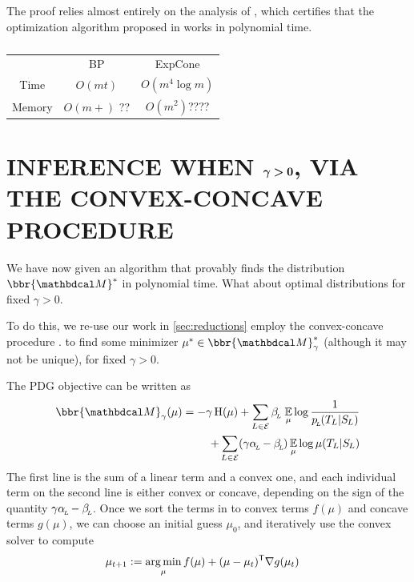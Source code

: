 \documentclass[twoside]{article}
\begin{document}
The proof relies almost entirely on the analysis of \textcite{badenbroek2021algorithm},
which certifies that the optimization algorithm 
proposed in \textcite{dahl2022primal} works in polynomial time. 

\begin{table}
    \centering
    \begin{tabular}{ccc}
        \toprule
        & BP &  ExpCone \\\cmidrule(lr){2-3}
        Time & $O(m t)$ & $O( m^4 \log m )$ \\
        Memory  & $O(m + )$ {\color{red}??} & $O( m^2 )${\color{red}????}\\    \bottomrule
    \end{tabular}
    
    
    \caption{ }
\end{table}


\section{INFERENCE WHEN
    \texorpdfstring{$\boldsymbol\gamma \boldsymbol> \mathbf{0}$}{gamma > 0},
    VIA THE CONVEX-CONCAVE PROCEDURE }

We have now given an algorithm that provably finds the distribution $\bbr{\dg M}^*$ in polynomial time. 
What about optimal distributions for fixed $\gamma > 0$.



To do this, we re-use our work in \cref{sec:reductions} employ the convex-concave procedure 
\parencite{yuille2003concave}. to find some minimizer $\mu^* \in \bbr{\dg M}^*_\gamma$ (although it may not be unique), for fixed $\gamma > 0$.

The PDG objective can be written as \parencite[Proposition 4.6]{pdg-aaai}
\begin{align*}
    \bbr{\dg M}_\gamma(\mu) = 
        -\gamma\H(\mu) + 
            \sum_{L \in \Ed}
                \beta\ssub L\, \Ex_\mu 
                    \log \frac1{p\ssub L(\Tgt L | \Src L)}
                \\
            + \sum_{L \in \Ed}
            (\gamma \alpha \ssub L - \beta\ssub L)
                \Ex_\mu \log \mu(\Tgt L | \Src L)
\end{align*}
The first line is the sum of a linear term and a convex one,
and each individual term on the second line is either convex or concave, depending on the sign of the quantity $\gamma \alpha_{\!_{L}\!} - \beta_{\!_{L}\!}$. 
Once we sort the terms in to convex terms $f(\mu)$ and concave terms $g(\mu)$, we can choose an initial guess $\mu_0$, and iteratively use the convex solver to compute
%
\begin{align*}
    \mu_{t+1} &:= \operatorname*{arg\,min}_{\mu} f(\mu) + (\mu - \mu_{t})^{\sf T}
        \nabla g(\mu_t)
\end{align*}
\end{document}
